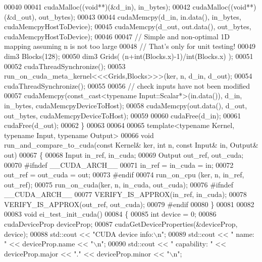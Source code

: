 \begin{DoxyCode}
00040   
00041   cudaMalloc((\textcolor{keywordtype}{void}**)(&d\_in),  in\_bytes);
00042   cudaMalloc((\textcolor{keywordtype}{void}**)(&d\_out), out\_bytes);
00043   
00044   cudaMemcpy(d\_in,  in.data(),  in\_bytes,  cudaMemcpyHostToDevice);
00045   cudaMemcpy(d\_out, out.data(), out\_bytes, cudaMemcpyHostToDevice);
00046   
00047   \textcolor{comment}{// Simple and non-optimal 1D mapping assuming n is not too large}
00048   \textcolor{comment}{// That's only for unit testing!}
00049   dim3 Blocks(128);
00050   dim3 Grids( (n+\textcolor{keywordtype}{int}(Blocks.x)-1)/\textcolor{keywordtype}{int}(Blocks.x) );
00051 
00052   cudaThreadSynchronize();
00053   run\_on\_cuda\_meta\_kernel<<<Grids,Blocks>>>(ker, n, d\_in, d\_out);
00054   cudaThreadSynchronize();
00055   
00056   \textcolor{comment}{// check inputs have not been modified}
00057   cudaMemcpy(const\_cast<typename Input::Scalar*>(in.data()),  d\_in,  in\_bytes,  cudaMemcpyDeviceToHost);
00058   cudaMemcpy(out.data(), d\_out, out\_bytes, cudaMemcpyDeviceToHost);
00059   
00060   cudaFree(d\_in);
00061   cudaFree(d\_out);
00062 \}
00063 
00064 
00065 \textcolor{keyword}{template}<\textcolor{keyword}{typename} Kernel, \textcolor{keyword}{typename} Input, \textcolor{keyword}{typename} Output>
00066 \textcolor{keywordtype}{void} run\_and\_compare\_to\_cuda(\textcolor{keyword}{const} Kernel& ker, \textcolor{keywordtype}{int} n, \textcolor{keyword}{const} Input& in, Output& out)
00067 \{
00068   Input  in\_ref,  in\_cuda;
00069   Output out\_ref, out\_cuda;
00070 \textcolor{preprocessor}{  #ifndef \_\_CUDA\_ARCH\_\_}
00071   in\_ref = in\_cuda = in;
00072   out\_ref = out\_cuda = out;
00073 \textcolor{preprocessor}{  #endif}
00074   run\_on\_cpu (ker, n, in\_ref,  out\_ref);
00075   run\_on\_cuda(ker, n, in\_cuda, out\_cuda);
00076 \textcolor{preprocessor}{  #ifndef \_\_CUDA\_ARCH\_\_}
00077   VERIFY\_IS\_APPROX(in\_ref, in\_cuda);
00078   VERIFY\_IS\_APPROX(out\_ref, out\_cuda);
00079 \textcolor{preprocessor}{  #endif}
00080 \}
00081 
00082 
00083 \textcolor{keywordtype}{void} ei\_test\_init\_cuda()
00084 \{
00085   \textcolor{keywordtype}{int} device = 0;
00086   cudaDeviceProp deviceProp;
00087   cudaGetDeviceProperties(&deviceProp, device);
00088   std::cout << \textcolor{stringliteral}{"CUDA device info:\(\backslash\)n"};
00089   std::cout << \textcolor{stringliteral}{"  name:                        "} << deviceProp.name << \textcolor{stringliteral}{"\(\backslash\)n"};
00090   std::cout << \textcolor{stringliteral}{"  capability:                  "} << deviceProp.major << \textcolor{stringliteral}{"."} << deviceProp.minor << \textcolor{stringliteral}{"\(\backslash\)n"};

\end{DoxyCode}
